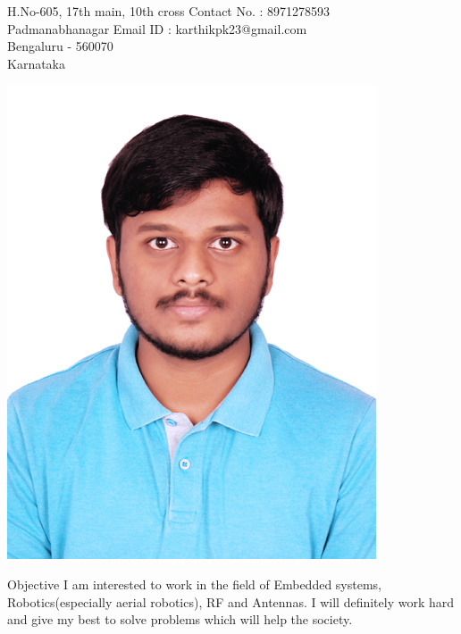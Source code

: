 \documentclass{resume} %
\begin{document}
\begin{rSection}{ }

H.No-605, 17th main, 10th cross \hfill  Contact No. : 8971278593 \\
Padmanabhanagar  \hfill Email ID : karthikpk23@gmail.com \\
Bengaluru - 560070\\
Karnataka\\
\end{rSection}

\begin{center}
\hspace{10 cm}
\includegraphics{karthik}
\end{center}

\vskip 0.5in

\begin{rSection}{Objective}
 I am interested to work in the field of Embedded systems, Robotics(especially aerial robotics), RF and Antennas. I will definitely work hard and give my best to solve problems which will help the society.
\end{rSection}

\vskip 0.5in
\end{document}

